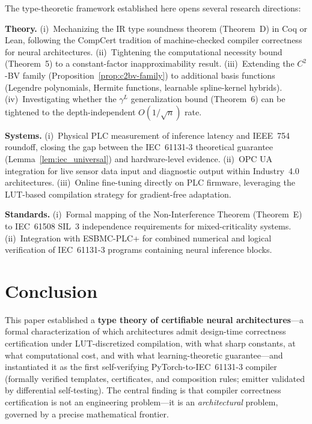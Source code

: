 \documentclass[journal,onecolumn]{IEEEtran}
\begin{document}
The type-theoretic framework established here opens several research directions:

\textbf{Theory.} (i)~Mechanizing the IR type soundness theorem (Theorem~D) in Coq
or Lean, following the CompCert tradition of machine-checked compiler
correctness for neural architectures. (ii)~Tightening the computational necessity
bound (Theorem~5) to a constant-factor inapproximability result.
(iii)~Extending the $C^2$-BV family (Proposition~\ref{prop:c2bv-family}) to
additional basis functions (Legendre polynomials, Hermite functions, learnable
spline-kernel hybrids). (iv)~Investigating whether the $\gamma^L$ generalization
bound (Theorem~6) can be tightened to the depth-independent $O(1/\sqrt{n})$ rate.

\textbf{Systems.} (i)~Physical PLC measurement of inference latency and
IEEE~754 roundoff, closing the gap between the IEC~61131-3 theoretical
guarantee (Lemma~\ref{lem:iec_universal}) and hardware-level evidence.
(ii)~OPC UA integration for live sensor data input and diagnostic output
within Industry~4.0 architectures. (iii)~Online fine-tuning directly on
PLC firmware, leveraging the LUT-based compilation strategy for
gradient-free adaptation.

\textbf{Standards.} (i)~Formal mapping of the Non-Interference Theorem
(Theorem~E) to IEC~61508 SIL~3 independence requirements for
mixed-criticality systems. (ii)~Integration with ESBMC-PLC+ for
combined numerical and logical verification of IEC~61131-3 programs
containing neural inference blocks.

\section{Conclusion}
\label{sec:conclusion}

This paper established a \textbf{type theory of certifiable neural
architectures}---a formal characterization of which architectures admit
design-time correctness certification under LUT-discretized compilation, with
what sharp constants, at what computational cost, and with what
learning-theoretic guarantee---and instantiated it as the first
self-verifying PyTorch-to-IEC~61131-3 compiler (formally verified
templates, certificates, and composition rules; emitter validated by
differential self-testing). The central finding is that compiler
correctness certification is not an engineering problem---it is an
\textit{architectural} problem, governed by a precise mathematical
frontier.
\end{document}
